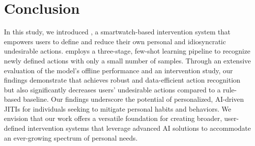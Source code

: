\section{Conclusion}
\label{sec:conclusion}
In this study, we introduced \projectname, a smartwatch-based intervention system that empowers users to define and reduce their own personal and idiosyncratic undesirable actions.
\projectname employs a three-stage, few-shot learning pipeline to recognize newly defined actions with only a small number of samples.
Through an extensive evaluation of the model's offline performance and an intervention study, our findings demonstrate that \projectname achieves robust and data-efficient action recognition but also significantly decreases users’ undesirable actions compared to a rule-based baseline.
Our findings underscore the potential of personalized, AI-driven JITIs for individuals seeking to mitigate personal habits and behaviors.
We envision that our work offers a versatile foundation for creating broader, user-defined intervention systems that leverage advanced AI solutions to accommodate an ever-growing spectrum of personal needs.


